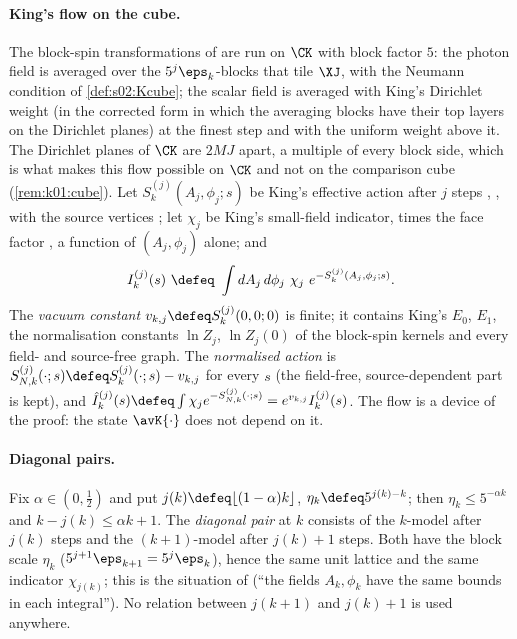 \paragraph{King's flow on the cube.} The block-spin transformations of \cite[Sect.~2]{K1} are run on $\CK$ with block factor $5$: the photon field is averaged over the $5^{j}\eps_k$-blocks that tile $\XJ$, with the Neumann condition of \cref{def:s02:Kcube}; the scalar field is averaged with King's Dirichlet weight \cite[(3.8)--(3.9)]{K2} (in the corrected form in which the averaging blocks have their top layers on the Dirichlet planes) at the finest step and with the uniform weight above it. The Dirichlet planes of $\CK$ are $2MJ$ apart, a multiple of every block side, which is what makes this flow possible on $\CK$ and not on the comparison cube (\cref{rem:k01:cube}). Let $S^{(j)}_k(A_j,\phi_j;s)$ be King's effective action after $j$ steps \cite[(3.14)]{K1}, \cite[(3.12)]{K2}, with the source vertices \cite[(3.20)--(3.21)]{K1}; let $\chi_j$ be King's small-field indicator, \cite[(3.2)]{K1} times the face factor \cite[(5.41)]{K2}, a function of $(A_j,\phi_j)$ alone; and
\[
\Ik{j}(s)\ \defeq\ \int dA_j\,d\phi_j\ \chi_j\ e^{-S^{(j)}_k(A_j,\phi_j;s)} .
\]
The \emph{vacuum constant} $v_{k,j}\defeq S^{(j)}_k(0,0;0)$ is finite; it contains King's $E_0$, $E_1$, the normalisation constants $\ln Z_j$, $\ln Z_j(0)$ of the block-spin kernels and every field- and source-free graph. The \emph{normalised action} is $S^{(j)}_{N,k}(\cdot;s)\defeq S^{(j)}_k(\cdot;s)-v_{k,j}$ for every $s$ (the field-free, source-dependent part is kept), and $\Ihat{j}(s)\defeq\int\chi_je^{-S^{(j)}_{N,k}(\cdot;s)}=e^{v_{k,j}}\Ik{j}(s)$. The flow is a device of the proof: the state $\avK{\cdot}$ does not depend on it.

\paragraph{Diagonal pairs.} Fix $\alpha\in(0,\frac12)$ and put $j(k)\defeq\lfloor(1-\alpha)k\rfloor$, $\eta_k\defeq5^{j(k)-k}$; then $\eta_k\le5^{-\alpha k}$ and $k-j(k)\le\alpha k+1$. The \emph{diagonal pair} at $k$ consists of the $k$-model after $j(k)$ steps and the $(k+1)$-model after $j(k)+1$ steps. Both have the block scale $\eta_k$ ($5^{j+1}\eps_{k+1}=5^{j}\eps_k$), hence the same unit lattice and the same indicator $\chi_{j(k)}$; this is the situation of \cite[p.~656]{K1} (``the fields $A_k,\phi_k$ have the same bounds in each integral''). No relation between $j(k+1)$ and $j(k)+1$ is used anywhere.

